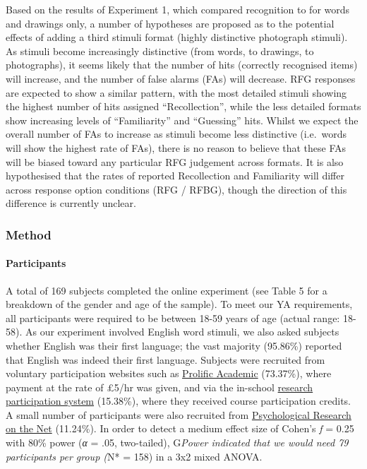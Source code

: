 \documentclass[
  11pt,
]{article}
\begin{document}
Based on the results of Experiment 1, which compared recognition to for
words and drawings only, a number of hypotheses are proposed as to the
potential effects of adding a third stimuli format (highly distinctive
photograph stimuli). As stimuli become increasingly distinctive (from
words, to drawings, to photographs), it seems likely that the number of
hits (correctly recognised items) will increase, and the number of false
alarms (FAs) will decrease. RFG responses are expected to show a similar
pattern, with the most detailed stimuli showing the highest number of
hits assigned ``Recollection'', while the less detailed formats show
increasing levels of ``Familiarity'' and ``Guessing'' hits. Whilst we
expect the overall number of FAs to increase as stimuli become less
distinctive (i.e.~words will show the highest rate of FAs), there is no
reason to believe that these FAs will be biased toward any particular
RFG judgement across formats. It is also hypothesised that the rates of
reported Recollection and Familiarity will differ across response option
conditions (RFG / RFBG), though the direction of this difference is
currently unclear.

\hypertarget{method-2}{%
\subsubsection{Method}\label{method-2}}

\hypertarget{participants-2}{%
\paragraph{Participants}\label{participants-2}}

A total of 169 subjects completed the online experiment (see Table 5 for
a breakdown of the gender and age of the sample). To meet our YA
requirements, all participants were required to be between 18-59 years
of age (actual range: 18-58). As our experiment involved English word
stimuli, we also asked subjects whether English was their first
language; the vast majority (95.86\%) reported that English was indeed
their first language. Subjects were recruited from voluntary
participation websites such as
\href{https://www.prolific.co/}{Prolific Academic} (73.37\%), where
payment at the rate of £5/hr was given, and via the in-school
\href{https://keelepsychology.sona-systems.com/}{research participation system}
(15.38\%), where they received course participation credits. A small
number of participants were also recruited from
\href{https://psych.hanover.edu/research/exponnet.html}{Psychological Research on the Net}
(11.24\%). In order to detect a medium effect size of Cohen's \emph{f} =
0.25 with 80\% power (\emph{α} = .05, two-tailed), G\emph{Power
indicated that we would need 79 participants per group (}N* = 158) in a
3x2 mixed ANOVA.
\end{document}
